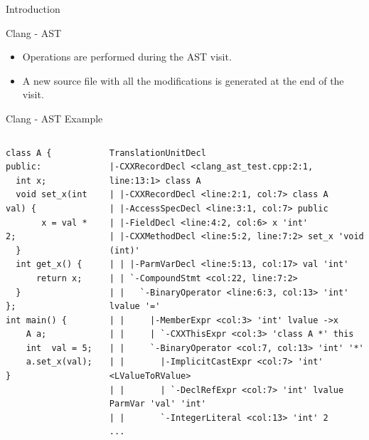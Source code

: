 \documentclass[xcolor=dvipsnames]{beamer}
\begin{document}
\begin{section}{Introduction}
\begin{frame}{\hskip 0.3cm Clang - AST}
\begin{itemize}
\item Operations are performed during the AST visit.

\item A new source file with all the modifications is generated at the end of the visit.

\end{itemize}

\end{frame}














\begin{frame}[fragile]{\hskip 0.3cm Clang - AST Example}

\begin{columns}

\begin{column}{4cm}
\begin{lstlisting}[language=CCC]
class A {
public:
  int x;
  void set_x(int val) {
       x = val * 2;
  }	
  int get_x() {
      return x;
  }
};
int main() {
    A a;
    int  val = 5;
    a.set_x(val);
}
\end{lstlisting}
\end{column}

\begin{column}{7.3cm}

\begin{lstlisting}[language=AST]
TranslationUnitDecl
|-CXXRecordDecl <clang_ast_test.cpp:2:1, line:13:1> class A
| |-CXXRecordDecl <line:2:1, col:7> class A
| |-AccessSpecDecl <line:3:1, col:7> public
| |-FieldDecl <line:4:2, col:6> x 'int'
| |-CXXMethodDecl <line:5:2, line:7:2> set_x 'void (int)'
| | |-ParmVarDecl <line:5:13, col:17> val 'int'
| | `-CompoundStmt <col:22, line:7:2>
| |   `-BinaryOperator <line:6:3, col:13> 'int' lvalue '='
| |     |-MemberExpr <col:3> 'int' lvalue ->x
| |     | `-CXXThisExpr <col:3> 'class A *' this
| |     `-BinaryOperator <col:7, col:13> 'int' '*'
| |       |-ImplicitCastExpr <col:7> 'int' <LValueToRValue>
| |       | `-DeclRefExpr <col:7> 'int' lvalue ParmVar 'val' 'int'
| |       `-IntegerLiteral <col:13> 'int' 2
...
\end{lstlisting}
\end{column}

\end{columns}


\end{frame}








\end{section}
\end{document}
